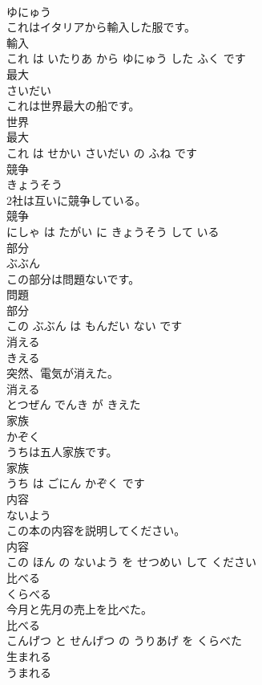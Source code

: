 \documentclass[8pt]{extreport}
\begin{document}
\begin{CJK}{UTF8}{min}
\\	ゆにゅう			
\\	これはイタリアから輸入した服です。	
\\	輸入 
\\	これ は いたりあ から ゆにゅう した ふく です			
\\	最大	
\\	さいだい			
\\	これは世界最大の船です。	
\\	世界 
\\	最大 
\\	これ は せかい さいだい の ふね です			
\\	競争	
\\	きょうそう			
\\	2社は互いに競争している。	
\\	競争 
\\	にしゃ は たがい に きょうそう して いる			
\\	部分	
\\	ぶぶん			
\\	この部分は問題ないです。	
\\	問題 
\\	部分 
\\	この ぶぶん は もんだい ない です			
\\	消える	
\\	きえる			
\\	突然、電気が消えた。	
\\	消える 
\\	とつぜん でんき が きえた			
\\	家族	
\\	かぞく			
\\	うちは五人家族です。	
\\	家族 
\\	うち は ごにん かぞく です			
\\	内容	
\\	ないよう			
\\	この本の内容を説明してください。	
\\	内容 
\\	この ほん の ないよう を せつめい して ください			
\\	比べる	
\\	くらべる			
\\	今月と先月の売上を比べた。	
\\	比べる 
\\	こんげつ と せんげつ の うりあげ を くらべた			
\\	生まれる	
\\	うまれる			

\end{CJK}
\end{document}
